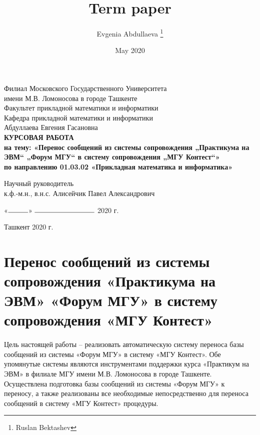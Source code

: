 \documentclass[12pt, a4paper, oneside]{article}
\title{Term paper}
\author{Evgenia Abdullaeva \thanks{Ruslan Bektashev}}
\date{May 2020}
\begin{document}
\begin{titlepage}
    \begin{center}
        Филиал Московского Государственного Университета\\
        имени М.В. Ломоносова в городе Ташкенте\\
        \vspace{0.5cm}
        Факультет прикладной математики и информатики\\
        Кафедра прикладной математики и информатики\\
        \vfill
        Абдуллаева Евгения Гасановна\\
        \vfill
        \textbf{КУРСОВАЯ РАБОТА\\
        на тему: «Перенос сообщений из системы сопровождения „Практикума на ЭВМ“ „Форум МГУ“ в систему сопровождения „МГУ Контест“»\\
        \vspace{0.5cm}
        по направлению 01.03.02 «Прикладная математика и информатика»}
    \end{center}
    \vfill
    \begin{flushleft}
        Научный руководитель\\
        к.ф.-м.н., в.н.с. Алисейчик Павел Александрович
    \end{flushleft}
    \vspace{0.5cm}
    \begin{flushright}
        «$\rule{1cm}{0.15mm}$» $\rule{3cm}{0.15mm}$ 2020 г.
    \end{flushright}
    \vfill
    \begin{center}
        Ташкент 2020 г.
    \end{center}
\end{titlepage}

\section*{Перенос сообщений из системы сопровождения «Практикума на ЭВМ» «Форум МГУ» в систему сопровождения «МГУ Контест»}
\paragraph{}
Цель настоящей работы – реализовать автоматическую систему переноса базы сообщений из системы «Форум МГУ» в систему «МГУ Контест». Обе упомянутые системы являются инструментами поддержки курса «Практикум на ЭВМ» в филиале МГУ имени М.В. Ломоносова в городе Ташкенте. Осуществлена подготовка базы сообщений из системы «Форум МГУ» к переносу, а также реализованы все необходимые непосредственно для переноса сообщений в систему «МГУ Контест» процедуры.
\setcounter{page}{2}
\newpage
\end{document}
